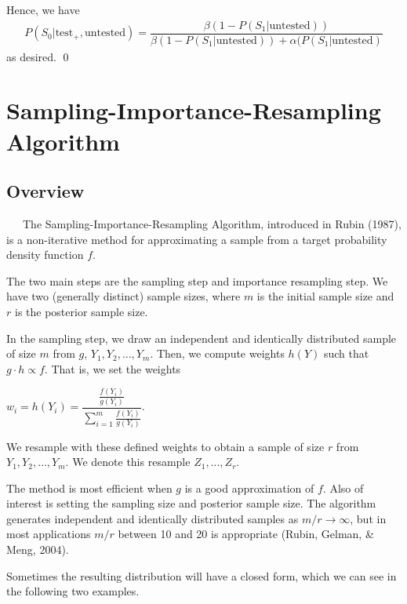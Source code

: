 \documentclass[12pt,twoside]{smiththesis}
\begin{document}
\noindent Hence, we have
\begin{align*}
P(S_0 |\text{test}_+, \text{untested}) = \dfrac{\beta (1- P(S_1|\text{untested}))}{\beta(1- P(S_1|\text{untested})) + \alpha(P(S_1|\text{untested})}
\end{align*}
\noindent as desired.
\qed

\newpage

\hypertarget{sampling-importance-resampling-algorithm}{%
\section{\texorpdfstring{Sampling-Importance-Resampling Algorithm \label{sampling}}{Sampling-Importance-Resampling Algorithm }}\label{sampling-importance-resampling-algorithm}}

\hypertarget{overview}{%
\subsection{Overview}\label{overview}}

~~~The Sampling-Importance-Resampling Algorithm, introduced in Rubin (1987), is a non-iterative method for approximating a sample from a target probability density function \(f\).

The two main steps are the sampling step and importance resampling step. We have two (generally distinct) sample sizes, where \(m\) is the initial sample size and \(r\) is the posterior sample size.

In the sampling step, we draw an independent and identically distributed sample of size \(m\) from \(g\), \(Y_1, Y_2, \dots, Y_m\). Then, we compute weights \(h(Y)\) such that \(g \cdot h \propto f\). That is, we set the weights

\(w_i = h(Y_i) = \dfrac{\frac{f(Y_i) } {g(Y_i)} }{\sum_{i=1}^m\frac{f(Y_i) } {g(Y_i)} }.\)

We resample with these defined weights to obtain a sample of size \(r\) from \(Y_1, Y_2, \dots, Y_m\). We denote this resample \(Z_1,\dots, Z_r\).

The method is most efficient when \(g\) is a good approximation of \(f\). Also of interest is setting the sampling size and posterior sample size. The algorithm generates independent and identically distributed samples as \(m/r \to \infty\), but in most applications \(m/r\) between 10 and 20 is appropriate (Rubin, Gelman, \& Meng, 2004).

Sometimes the resulting distribution will have a closed form, which we can see in the following two examples.
\end{document}
